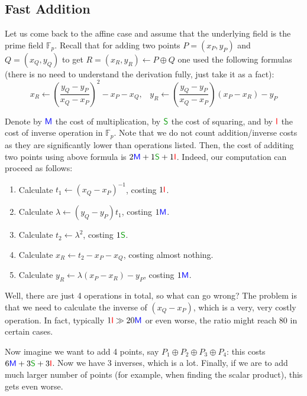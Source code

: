 \documentclass[../lecture-notes.tex]{subfiles}
\begin{document}
\subsection{Fast Addition}

Let us come back to the affine case and assume that the underlying field is the prime field $\mathbb{F}_p$. Recall that for adding two points $P=(x_P,y_P)$ and $Q=(x_Q,y_Q)$ to get $R=(x_R,y_R) \gets P \oplus Q$ one used the following formulas (there is no need to understand the derivation fully, just take it as a fact):
\begin{equation}
    x_R \gets \left(\frac{y_Q-y_P}{x_Q-x_P}\right)^2 - x_P - x_Q, \;\;\; y_R \gets \left(\frac{y_Q-y_P}{x_Q-x_P}\right)(x_P-x_R) - y_P
\end{equation}

Denote by $\textcolor{blue}{\mathsf{M}}$ the cost of multiplication, by $\textcolor{green!60!black}{\mathsf{S}}$ the cost of squaring, and by $\textcolor{red}{\mathsf{I}}$ the cost of inverse operation in $\mathbb{F}_p$. Note that we do not count addition/inverse costs as they are significantly lower than operations listed. Then, the cost of additing two points using above formula is $2\textcolor{blue}{\mathsf{M}} + 1\textcolor{green!60!black}{\mathsf{S}} + 1\textcolor{red}{\mathsf{I}}$. Indeed, our computation can proceed as follows:
\begin{enumerate}
    \item Calculate $t_1 \gets (x_Q-x_P)^{-1}$, costing $1\textcolor{red}{\mathsf{I}}$.
    \item Calculate $\lambda \gets (y_Q-y_P)t_1$, costing $1\textcolor{blue}{\mathsf{M}}$.
    \item Calculate $t_2 \gets \lambda^2$, costing $1\textcolor{green!60!black}{\mathsf{S}}$.
    \item Calculate $x_R \gets t_2 - x_P - x_Q$, costing almost nothing.
    \item Calculate $y_R \gets \lambda (x_P-x_R) - y_P$, costing $1\textcolor{blue}{\mathsf{M}}$.
\end{enumerate}

Well, there are just 4 operations in total, so what can go wrong? The problem is that we need to calculate the inverse of $(x_Q-x_P)$, which is a very, very costly operation. In fact, typically $1\textcolor{red}{\mathsf{I}} \gg 20\textcolor{blue}{\mathsf{M}}$ or even worse, the ratio might reach $80$ in certain cases.

Now imagine we want to add 4 points, say $P_1 \oplus P_2 \oplus P_3 \oplus P_4$: this costs $6\textcolor{blue}{\mathsf{M}} + 3\textcolor{green!60!black}{\mathsf{S}} + 3\textcolor{red}{\mathsf{I}}$. Now we have 3 inverses, which is a lot. Finally, if we are to add much larger number of points (for example, when finding the scalar product), this gets even worse. 
\end{document}

